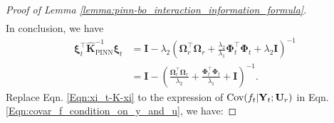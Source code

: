 \begin{proof}[Proof of Lemma \ref{lemma:pinn-bo_interaction_information_formula}]
\begin{align*}
    \end{align*}
In conclusion, we have 
\begin{align}
        \boldsymbol{\xi}_t^\top \mathbf{\widehat{K}}_\mathrm{PINN}^{-1} \boldsymbol{\xi}_t &= \mathbf{I} - \lambda_2 \left(\boldsymbol{\Omega}_r^\top\boldsymbol{\Omega}_r+\frac{\lambda_2} {\lambda_1} \boldsymbol{\Phi}_t^\top \boldsymbol{\Phi}_t+ \lambda_2 \mathbf{I}\right)^{-1} \nonumber
        \\
        &= \mathbf{I} -  \left(\frac{\boldsymbol{\Omega}_r^\top\boldsymbol{\Omega}_r}{\lambda_2}+\frac{\boldsymbol{\Phi}_t^\top \boldsymbol{\Phi}_t} {\lambda_1} + \mathbf{I}\right)^{-1}. \label{Eqn:xi_t-K-xi} 
\end{align}
Replace Eqn. \eqref{Eqn:xi_t-K-xi} to the expression of $\textup{Cov}(f_t \rvert \mathbf{Y}_t; \mathbf{U}_r)$ in Eqn. \eqref{Eqn:covar_f_condition_on_y_and_u}, we have: 


\end{proof}
